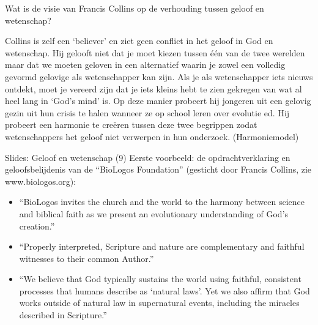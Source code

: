 \documentclass[main.tex]{subfiles}
\begin{document}
\begin{examenvraag}
    \begin{vraag}
        Wat is de visie van Francis Collins op de verhouding tussen geloof en 
        wetenschap?
    \end{vraag}			
    			
    \begin{antwoord}
	Collins is zelf een‭ ‬‘believer‭’‬ en ziet geen conflict in het geloof in God 
	en wetenschap.‭ ‬Hij gelooft niet dat je moet kiezen tussen één van de twee 
	werelden maar dat we moeten geloven in een alternatief waarin je zowel 
	een volledig gevormd gelovige als wetenschapper kan zijn.‭ ‬Als je als 
	wetenschapper iets nieuws ontdekt,‭ ‬moet je vereerd zijn dat je iets 
	kleins hebt te zien gekregen van wat al heel lang in‭ ‬‘God‭’‬s mind‭’‬ is.‭ ‬Op 
	deze manier probeert hij jongeren uit een gelovig gezin uit hun crisis te 
	halen wanneer ze op school leren over evolutie ed.‭ ‬Hij probeert een 
	harmonie te creëren tussen deze twee begrippen zodat wetenschappers het 
	geloof niet verwerpen in hun onderzoek. (Harmoniemodel)
    	
    	\begin{citaat}{Slides: Geloof en wetenschap (9)}
    	Eerste voorbeeld: de opdrachtverklaring en geloofsbelijdenis
		van de “BioLogos Foundation” (gesticht door
		Francis Collins, zie www.biologos.org):
		\begin{itemize}
		\item “BioLogos invites the church and the world to the harmony
			between science and biblical faith as we present an evolutionary
			understanding of God’s creation.”
		\item “Properly interpreted, Scripture and nature are complementary
			and faithful witnesses to their common Author.”
		\item “We believe that God typically sustains the world using 			
			faithful,
			consistent processes that humans describe as ‘natural laws’. Yet
			we also affirm that God works outside of natural law in
			supernatural events, including the miracles described in
			Scripture.”
		\end{itemize}
    	\end{citaat}
    \end{antwoord}
\end{examenvraag}
\end{document}
